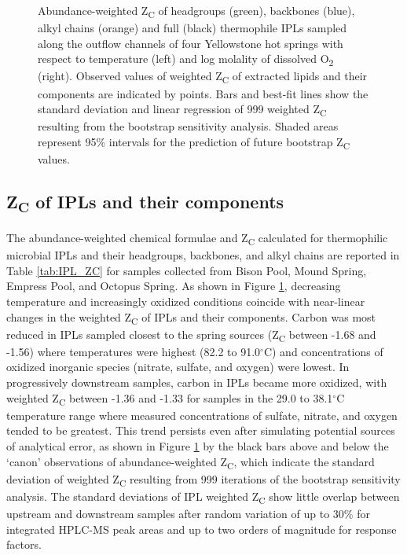 {\begin{figure}[h]
\begin{subfigure}[b]{0.18\linewidth}
    \end{subfigure}
\caption[Abundance-weighted Z\textsubscript{C} of IPLs and their component parts]{Abundance-weighted Z\textsubscript{C} of headgroups (green), backbones (blue), alkyl chains (orange) and full (black) thermophile IPLs sampled along the outflow channels of four Yellowstone hot springs with respect to temperature (left) and log molality of dissolved O\textsubscript{2} (right). Observed values of weighted Z\textsubscript{C} of extracted lipids and their components are indicated by points. Bars and best-fit lines show the standard deviation and linear regression of 999 weighted Z\textsubscript{C} resulting from the bootstrap sensitivity analysis. Shaded areas represent 95\% intervals for the prediction of future bootstrap Z\textsubscript{C} values.}
\label{fig:weighted_ZC}
\end{figure}
\doublespace
\clearpage
}

\subsection{Z\textsubscript{C} of IPLs and their components}

The abundance-weighted chemical formulae and Z\textsubscript{C} calculated for thermophilic microbial IPLs and their headgroups, backbones, and alkyl chains are reported in Table \ref{tab:IPL_ZC} for samples collected from Bison Pool, Mound Spring, Empress Pool, and Octopus Spring. As shown in Figure \ref{fig:weighted_ZC}, decreasing temperature and increasingly oxidized conditions coincide with near-linear changes in the weighted Z\textsubscript{C} of IPLs and their components. Carbon was most reduced in IPLs sampled closest to the spring sources (Z\textsubscript{C} between -1.68 and -1.56) where temperatures were highest (82.2 to 91.0$^\circ$C) and concentrations of oxidized inorganic species (nitrate, sulfate, and oxygen) were lowest. In progressively downstream samples, carbon in IPLs became more oxidized, with weighted Z\textsubscript{C} between -1.36 and -1.33 for samples in the 29.0 to 38.1$^\circ$C temperature range where measured concentrations of sulfate, nitrate, and oxygen tended to be greatest. This trend persists even after simulating potential sources of analytical error, as shown in Figure \ref{fig:weighted_ZC} by the black bars above and below the `canon' observations of abundance-weighted Z\textsubscript{C}, which indicate the standard deviation of weighted Z\textsubscript{C} resulting from 999 iterations of the bootstrap sensitivity analysis. The standard deviations of IPL weighted Z\textsubscript{C} show little overlap between upstream and downstream samples after random variation of up to 30\% for integrated HPLC-MS peak areas and up to two orders of magnitude for response factors.

